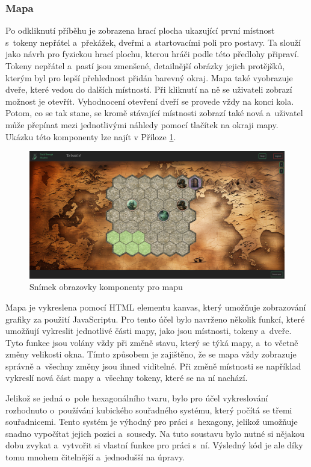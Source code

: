 \subsubsection*{Mapa}
Po odkliknutí příběhu je zobrazena hrací plocha ukazující první místnost s~tokeny nepřátel a~překážek, dveřmi a~startovacími poli pro postavy. Ta slouží jako návrh pro fyzickou hrací plochu, kterou hráči podle této předlohy připraví. Tokeny nepřátel a~pastí jsou zmenšené, detailnější obrázky jejich protějšků, kterým byl pro lepší přehlednost přidán barevný okraj. Mapa také vyobrazuje dveře, které vedou do dalších místností. Při kliknutí na ně se uživateli zobrazí možnost je otevřít. Vyhodnocení otevření dveří se provede vždy na konci kola. Potom, co se tak stane, se kromě stávající místnosti zobrazí také nová a~uživatel může přepínat mezi jednotlivými náhledy pomocí tlačítek na okraji mapy. Ukázku této komponenty lze najít v Příloze \ref{fig:map}.

\begin{figure}[h]
  \centering
  \includegraphics[width=\textwidth]{resources/figures/TTS-Map.png}
  \caption{Snímek obrazovky komponenty pro mapu}
  \label{fig:map}
\end{figure}

Mapa je vykreslena pomocí HTML elementu kanvas, který umožňuje zobrazování grafiky za použití JavaScriptu. Pro tento účel bylo navrženo několik funkcí, které umožňují vykreslit jednotlivé části mapy, jako jsou místnosti, tokeny a~dveře. Tyto funkce jsou volány vždy při změně stavu, který se týká mapy, a~to včetně změny velikosti okna. Tímto způsobem je zajištěno, že se mapa vždy zobrazuje správně a~všechny změny jsou ihned viditelné. Při změně místnosti se například vykreslí nová část mapy a~všechny tokeny, které se na ní nachází.

Jelikož se jedná o~pole hexagonálního tvaru, bylo pro účel vykreslování rozhodnuto o~používání kubického souřadného systému, který počítá se třemi souřadnicemi. Tento systém je výhodný pro práci s~hexagony, jelikož umožňuje snadno vypočítat jejich pozici a~sousedy. Na tuto soustavu bylo nutné si nějakou dobu zvykat a~vytvořit si vlastní funkce pro práci s~ní. Výsledný kód je ale díky tomu mnohem čitelnější a~jednodušší na úpravy.


